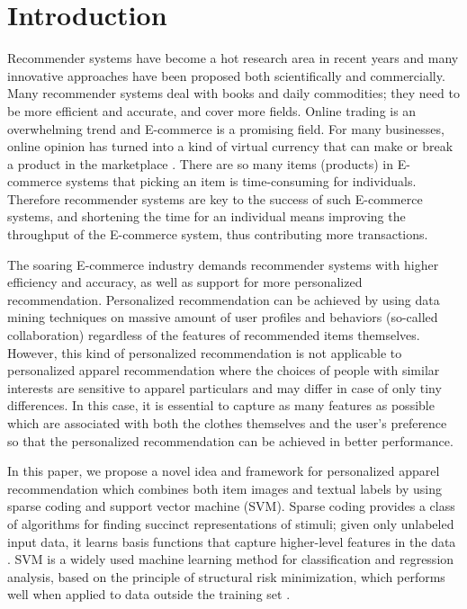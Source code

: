 \section{Introduction}\label{sec:intro}

Recommender systems have become a hot research area in recent years and 
  many innovative approaches have been proposed both scientifically and commercially. 
Many recommender systems deal with books and daily commodities; 
  they need to be more efficient and accurate, and cover more fields.
Online trading is an overwhelming trend and E-commerce is a promising field. 
For many businesses, online opinion has turned into a kind of virtual currency 
  that can make or break a product in the marketplace \cite{Wright09}. 
There are so many items (products) in E-commerce systems that 
  picking an item is time-consuming for individuals.
Therefore recommender systems are key to the success of such E-commerce systems, 
  and shortening the time for an individual means improving the 
  throughput of the E-commerce system, thus contributing more transactions.

The soaring E-commerce industry demands recommender systems 
  with higher efficiency and accuracy, as well as support for more 
  personalized recommendation.
Personalized recommendation can be achieved by using data mining techniques on 
  massive amount of user profiles and behaviors (so-called collaboration) 
  regardless of the features of recommended items themselves. 
However, this kind of personalized recommendation is not applicable to 
  personalized apparel recommendation where the choices of people with similar interests 
  are sensitive to apparel particulars and may differ in case of only tiny differences. 
In this case, it is essential to capture as many features as possible 
  which are associated with both the clothes themselves and the user's preference 
  so that the personalized recommendation can be achieved in better performance. 

In this paper, we propose a novel idea and framework for personalized apparel recommendation
  which combines both item images and textual labels by using sparse coding and 
  support vector machine (SVM). 
Sparse coding provides a class of algorithms for finding succinct representations of stimuli; 
  given only unlabeled input data, it learns basis functions that capture higher-level features 
  in the data \cite{Lee07}.
SVM is a widely used machine learning method for classification and regression analysis,
  based on the principle of structural risk minimization, which performs well when applied to 
  data outside the training set \cite{El02}.

